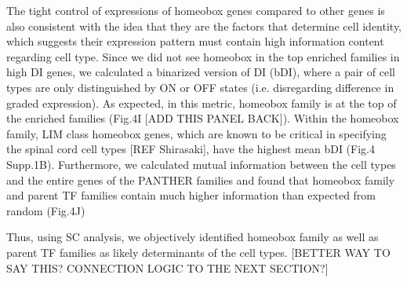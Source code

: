 The tight control of expressions of homeobox genes compared to other genes is also consistent with the idea that they are the factors that determine cell identity, which suggests their expression pattern must contain high information content regarding cell type. Since we did not see homeobox in the top enriched families in high DI genes, we calculated a binarized version of DI (bDI), where a pair of cell types are only distinguished by ON or OFF states (i.e. disregarding difference in graded expression). As expected, in this metric, homeobox family is at the top of the enriched families (Fig.4I [ADD THIS PANEL BACK]). Within the homeobox family, LIM class homeobox genes, which are known to be critical in specifying the spinal cord cell types [REF Shirasaki], have the highest mean bDI (Fig.4 Supp.1B). Furthermore, we calculated mutual information between the cell types and the entire genes of the PANTHER families and found that homeobox family and parent TF families contain much higher information than expected from random (Fig.4J)

Thus, using SC analysis, we objectively identified homeobox family as well as parent TF families as likely determinants of the cell types. [BETTER WAY TO SAY THIS? CONNECTION LOGIC TO THE NEXT SECTION?]
